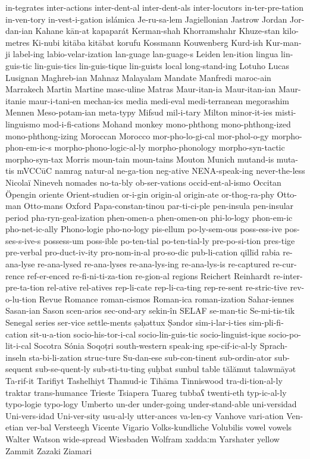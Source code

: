 {in-tegrates
inter-actions
inter-dent-al
inter-dent-als
inter-locutors
in-ter-pre-tation
in-ven-tory
in-vest-i-gation
islámica
Je-ru-sa-lem
Jagiellonian
Jastrow
Jordan
Jor-dan-ian
Kahane
kān-at
kapaparát
Kerman-shah
Khorramshahr
Khuze-stan
kilo-metres
Ki-nubi
kitāba
kitābat
korufu
Kossmann
Kouwenberg
Kurd-ish
Kur-man-ji
label-ing
labio-velar-ization
lan-guage
lan-guage-s
Leiden
len-ition
lingua
lin-guis-tic
lin-guis-tics
lin-guis-tique
lin-guists
local
long-stand-ing
Lotuho
Lucas
Lusignan
Maghreb-ian
Mahnaz
Malayalam
Mandate
Manfredi
maroc-ain
Marrakech
Martin
Martine
masc-uline
Matras
Maur-itan-ia
Maur-itan-ian
Maur-itanie
maur-i-tani-en
mechan-ics
media
medi-eval
medi-terranean
megorashim
Mennen
Meso-potam-ian
meta-typy
Mifsud
mil-i-tary
Milton
minor-it-ies
misti-linguismo
mod-i-fi-cations
Mohand
monkey
mono-phthong
mono-phthong-ized
mono-phthong-izing
Moroccan
Morocco
mor-pho-lo-gi-cal
mor-phol-o-gy
morpho-phon-em-ic-s
morpho-phono-logic-al-ly
morpho-phonology
morpho-syn-tactic
morpho-syn-tax
Morris
moun-tain
moun-tains
Mouton
Munich
mutand-is
muta-tis
mVCCūC
namrag
natur-al
ne-ga-tion
neg-ative
NENA-speak-ing
never-the-less
Nicolaï
Nineveh
nomades
no-ta-bly
ob-ser-vations
occid-ent-al-ismo
Occitan
Öpengin
oriente
Orient-studien
or-i-gin
origin-al
origin-ate
or-thog-ra-phy
Otto-man
Otto-mans
Oxford
Papa-constan-tinou
par-ti-ci-ple
pen-insula
pen-insular
period
pha-ryn-geal-ization
phen-omen-a
phen-omen-on
phi-lo-logy
phon-em-ic
pho-net-ic-ally
Phono-logie
pho-no-logy
pis-ellum
po-ly-sem-ous
poss-ess-ive
pos-ses-s-ive-s
possess-um
poss-ible
po-ten-tial
po-ten-tial-ly
pre-po-si-tion
pres-tige
pre-verbal
pro-duct-iv-ity
pro-nom-in-al
pro-so-dic
pub-li-cation
qillīd
rabia
re-ana-lyse
re-ana-lysed
re-ana-lyses
re-ana-lys-ing
re-ana-lys-is
re-captured
re-cur-rence
ref-er-enced
re-fi-ni-ti-za-tion
re-gion-al
regions
Reichert
Reinhardt
re-inter-pre-ta-tion
rel-ative
rel-atives
rep-li-cate
rep-li-ca-ting
rep-re-sent
re-stric-tive
rev-o-lu-tion
Revue
Romance
roman-cismos
Roman-ica
roman-ization
Sahar-iennes
Sasan-ian
Sason
scen-arios
sec-ond-ary
sekin-în
SELAF
se-man-tic
Se-mi-tis-tik
Senegal
series
ser-vice
settle-ments
ṣəḥəttux
Ṣəndor
sim-i-lar-i-ties
sim-pli-fi-cation
sit-u-a-tion
socio-his-tor-i-cal
socio-lin-guis-tic
socio-linguist-ique
socio-po-lit-i-cal
Socotra
Sónia
Soqoṭri
south-western
speak-ing
spe-cif-ic-al-ly
Sprach-inseln
sta-bi-li-zation
struc-ture
Su-dan-ese
sub-con-tinent
sub-ordin-ator
sub-sequent
sub-se-quent-ly
sub-sti-tu-ting
ṣuḥbat
sunbul
table
tălămut
talawmāyət
Ta-rif-it
Tarifiyt
Tashelhiyt
Thamud-ic
Tihāma
Tinniswood
tra-di-tion-al-ly
traktar
trans-humance
Trieste
Tsiapera
Tuareg
tubbaʕ
twenti-eth
typ-ic-al-ly
typo-logie
typo-logy
Umberto
un-der
under-going
under-stand-able
uni-versidad
Uni-vers-idad
Uni-ver-sity
usu-al-ly
utter-ances
va-len-cy
Vanhove
vari-ation
Ven-etian
ver-bal
Versteegh
Vicente
Vigario
Volks-kundliche
Volubilis
vowel
vowels
Walter
Watson
wide-spread
Wiesbaden
Wolfram
xaddaːm
Yarshater
yellow
Zammit
Zazaki
Ziamari
}
